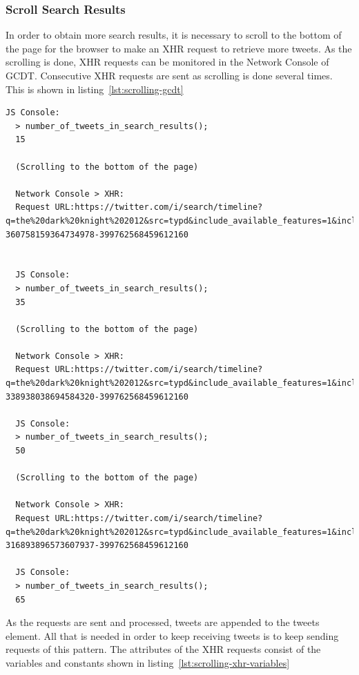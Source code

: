 \subsubsection{Scroll Search Results}
In order to obtain more search results, it is necessary to scroll to the bottom of the page for the browser to make an XHR request to retrieve more tweets. As the scrolling is done, XHR requests can be monitored in the Network Console of GCDT. Consecutive XHR requests are sent as scrolling is done several times. This is shown in listing~\ref{lst:scrolling-gcdt}

  \begin{lstlisting}[caption={GCDT JS Console and Network Console showing the effects of scrolling to the bottom of the Twitter search result page several times.},label={lst:scrolling-gcdt},captionpos=b]
  JS Console:
  > number_of_tweets_in_search_results();
  15

  (Scrolling to the bottom of the page)

  Network Console > XHR:
  Request URL:https://twitter.com/i/search/timeline?q=the%20dark%20knight%202012&src=typd&include_available_features=1&include_entities=1&last_note_ts=0&scroll_cursor=TWEET-360758159364734978-399762568459612160


  JS Console:
  > number_of_tweets_in_search_results();
  35

  (Scrolling to the bottom of the page)

  Network Console > XHR:
  Request URL:https://twitter.com/i/search/timeline?q=the%20dark%20knight%202012&src=typd&include_available_features=1&include_entities=1&last_note_ts=0&oldest_unread_id=0&scroll_cursor=TWEET-338938038694584320-399762568459612160

  JS Console:
  > number_of_tweets_in_search_results();
  50

  (Scrolling to the bottom of the page)

  Network Console > XHR:
  Request URL:https://twitter.com/i/search/timeline?q=the%20dark%20knight%202012&src=typd&include_available_features=1&include_entities=1&last_note_ts=0&oldest_unread_id=0&scroll_cursor=TWEET-316893896573607937-399762568459612160

  JS Console:
  > number_of_tweets_in_search_results();
  65
  \end{lstlisting}

As the requests are sent and processed, tweets are appended to the tweets element. All that is needed in order to keep receiving tweets is to keep sending requests of this pattern.
The attributes of the XHR requests consist of the variables and constants shown in listing~\ref{lst:scrolling-xhr-variables}

